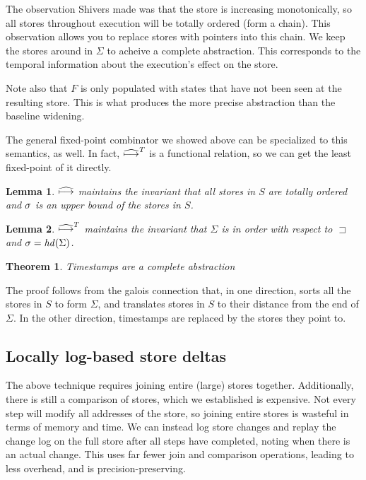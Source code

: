 \documentclass[preprint,onecolumn,9pt]{sigplanconf} %
\newtheorem{theorem}{Theorem}
\newtheorem{lemma}{Lemma}
\begin{document}
The observation Shivers made was that the store is increasing
monotonically, so all stores throughout execution will be totally
ordered (form a chain). This observation allows you to replace stores
with pointers into this chain. We keep the stores around in $\Sigma$
to acheive a complete abstraction. This corresponds to the temporal
information about the execution's effect on the store.

Note also that $F$ is only populated with states that have not been
seen at the resulting store. This is what produces the more precise
abstraction than the baseline widening.

The general fixed-point combinator we showed above can be specialized
to this semantics, as well. In fact, $\widehat{\mathbin{\longmapsto}}^T$ is a functional
relation, so we can get the least fixed-point of it directly.

\begin{lemma}
  $\widehat{\mathbin{\longmapsto}}$ maintains the invariant that all stores in $S$ are
  totally ordered and $\sigma$ is an upper bound of the stores in $S$.
\end{lemma}

\begin{lemma}
  $\widehat{\mathbin{\longmapsto}}^T$ maintains the invariant that $\Sigma$ is in
  order with respect to $\sqsupset$ and $\sigma = \mathit{hd}(\Sigma)$.
\end{lemma}

\begin{theorem}
Timestamps are a complete abstraction
\end{theorem}
The proof follows from the galois connection that, in one direction,
sorts all the stores in $S$ to form $\Sigma$, and translates stores in
$S$ to their distance from the end of $\Sigma$. In the other
direction, timestamps are replaced by the stores they point to.

\subsection{Locally log-based store deltas}

The above technique requires joining entire (large) stores
together. Additionally, there is still a comparison of stores, which
we established is expensive. Not every step will modify all addresses
of the store, so joining entire stores is wasteful in terms of memory
and time. We can instead log store changes and replay the change log
on the full store after all steps have completed, noting when there is
an actual change. This uses far fewer join and comparison operations,
leading to less overhead, and is precision-preserving.
\end{document}
